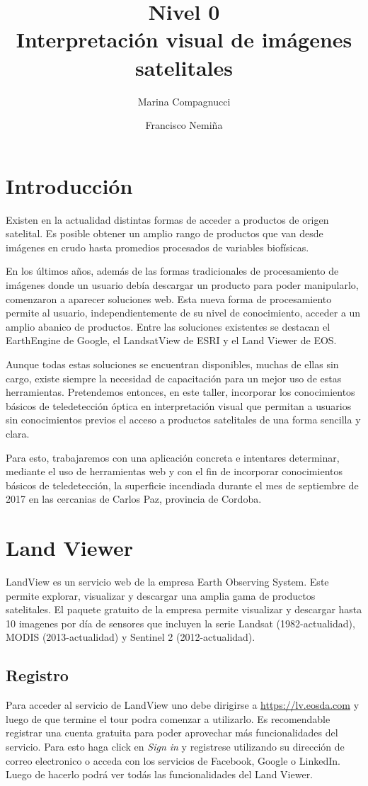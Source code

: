 \documentclass[a4paper,12pt]{book}
\title{{\large Nivel 0} \\ Interpretación visual de imágenes satelitales}
\author{Marina Compagnucci \and Francisco Nemiña}
\begin{document}
\maketitle
\titlepage

\chapter{Introducción}
Existen en la actualidad distintas formas de acceder a productos de origen satelital. Es posible obtener un amplio rango de productos que van desde imágenes en crudo hasta promedios procesados de variables biofísicas.

En los últimos años, además de las formas tradicionales de procesamiento de imágenes donde un usuario debía descargar un producto para poder manipularlo, comenzaron a aparecer soluciones web. Esta nueva forma de procesamiento permite al usuario, independientemente de su nivel de conocimiento, acceder a un amplio abanico de productos. Entre las soluciones existentes se destacan el EarthEngine de Google, el LandsatView de ESRI y el Land Viewer de EOS.

Aunque todas estas soluciones se encuentran disponibles, muchas de ellas sin cargo, existe siempre la necesidad de capacitación para un mejor uso de estas herramientas. Pretendemos entonces, en este taller, incorporar los conocimientos básicos de teledetección óptica en interpretación visual que permitan a usuarios sin conocimientos previos el acceso a productos satelitales de una forma sencilla y clara.

Para esto, trabajaremos con una aplicación concreta e intentares determinar, mediante el uso de herramientas web y con el fin de incorporar conocimientos básicos de teledetección, la superficie incendiada durante el mes de septiembre de 2017 en las cercanias de Carlos Paz, provincia de Cordoba.

\chapter{Land Viewer}

LandView es un servicio web de la empresa Earth Observing System. Este permite explorar, visualizar y descargar una amplia gama de productos satelitales. El paquete gratuito de la empresa permite visualizar y descargar hasta 10 imagenes por día de sensores que incluyen la serie Landsat (1982-actualidad), MODIS (2013-actualidad) y Sentinel 2 (2012-actualidad).

\section{Registro}
Para acceder al servicio de LandView uno debe dirigirse a \url{https://lv.eosda.com} y luego de que termine el tour podra comenzar a utilizarlo. Es recomendable registrar una cuenta gratuita para poder aprovechar más funcionalidades del servicio. Para esto haga click en \emph{Sign in} y registrese utilizando su dirección de correo electronico o acceda con los servicios de Facebook, Google o LinkedIn. Luego de hacerlo podrá ver todás las funcionalidades del Land Viewer.
\end{document}
